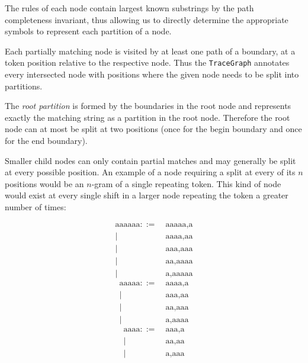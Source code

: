 \noindent The rules of each node contain largest known substrings by the path completeness invariant, thus allowing us to directly determine the appropriate symbols to represent each partition of a node.

\noindent Each partially matching node is visited by at least one path of a boundary, at a token position relative to the respective node. Thus the \texttt{TraceGraph} annotates every intersected node with positions where the given node needs to be split into partitions. 

\noindent The \textit{root partition} is formed by the boundaries in the root node and represents exactly the matching string as a partition in the root node. Therefore the root node can at most be split at two positions (once for the begin boundary and once for the end boundary).

\noindent Smaller child nodes can only contain partial matches and may generally be split at every possible position. An example of a node requiring a split at every of its $n$ positions would be an $n$-gram of a single repeating token. This kind of node would exist at every single shift in a larger node repeating the token a greater number of times:

{
    \ttfamily
    \begin{multicols}{3}
    \noindent
    \begin{align*}
        \text{aaaaaa} ::= &\ \text{aaaaa,a}\\
                |&\ \text{aaaa,aa}\\
                |&\ \text{aaa,aaa}\\
                |&\ \text{aa,aaaa}\\
                |&\ \text{a,aaaaa}
    \end{align*}
    \begin{align*}
        \text{aaaaa} ::= &\ \text{aaaa,a}\\
                |&\ \text{aaa,aa}\\
                |&\ \text{aa,aaa}\\
                |&\ \text{a,aaaa}
    \end{align*}
    \begin{align*}
        \text{aaaa} ::= &\ \text{aaa,a}\\
                |&\ \text{aa,aa}\\
                |&\ \text{a,aaa}
    \end{align*}
    \end{multicols}
}
\bigskip

